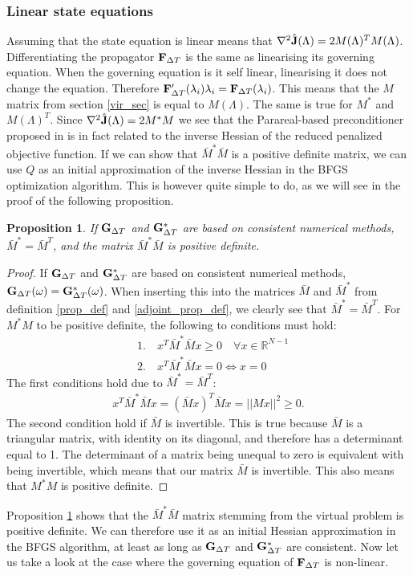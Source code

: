 \documentclass[11pt,a4paper]{article}
\newtheorem{proposition}{Proposition}
\begin{document}
\subsubsection{Linear state equations}
Assuming that the state equation is linear means that $\nabla^2 \hat{\bold J}(\Lambda)=2M(\Lambda)^TM(\Lambda)$. Differentiating the propagator $\bold F_{\Delta T}$ is the same as linearising its governing equation. When the governing equation is it self linear, linearising it does not change the equation. Therefore $\bold F_{\Delta T}'(\lambda_i)\lambda_i = \bold F_{\Delta T}(\lambda_i)$. This means that the $M$ matrix from section \ref{vir_sec} is equal to $M(\Lambda)$. The same is true for $M^*$ and $M(\Lambda)^T$. Since  $\nabla^2 \hat{\bold J}(\Lambda)=2M^*M$ we see that the Parareal-based preconditioner proposed in \cite{maday2002parareal} is in fact related to the inverse Hessian of the reduced penalized objective function. If we can show that $\bar M^*\bar M$ is a positive definite matrix, we can use $Q$ as an initial approximation of the inverse Hessian in the BFGS optimization algorithm. This is however quite simple to do, as we will see in the proof of the following proposition.
\begin{proposition} \label{pos_def_prop}
 If $\bold G_{\Delta T}$ and $\bold G_{\Delta T}^*$ are based on consistent numerical methods, $\bar M^*=\bar M^T$, and the matrix $\bar M^*\bar M$ is positive definite.
\end{proposition}
\begin{proof}
If $\bold G_{\Delta T}$ and $\bold G_{\Delta T}^*$ are based on consistent numerical methods, $\bold G_{\Delta T}(\omega)=\bold G_{\Delta T}^*(\omega)$. When inserting this into the matrices $\bar M$ and $\bar M^*$ from definition \ref{prop_def} and \ref{adjoint_prop_def}, we clearly see that $\bar M^*=\bar M^T$. For $M^*M$ to be positive definite, the following to conditions must hold:
\begin{align*}
&1.\quad x^T\bar M^*\bar Mx \geq 0 \quad \forall x\in\mathbb{R}^{N-1} \\
&2.\quad x^T\bar M^*\bar Mx =0 \iff x=0
\end{align*}
The first conditions hold due to $\bar M^*=\bar M^T$:
\begin{align*}
x^T\bar M^*\bar Mx = (\bar Mx)^T\bar Mx = ||Mx||^2 \geq 0.
\end{align*}
The second condition hold if $\bar M$ is invertible. This is true because $\bar M$ is a triangular matrix, with identity on its diagonal, and therefore has a determinant equal to 1. The determinant of a matrix being unequal to zero is equivalent with being invertible, which means that our matrix $\bar M$ is invertible. This also means that $M^*M$ is positive definite.
\end{proof}
Proposition \ref{pos_def_prop} shows that the $\bar M^*\bar M$ matrix stemming from the virtual problem is positive definite. We can therefore use it as an initial Hessian approximation in the BFGS algorithm, at least as long as $\bold G_ {\Delta T}$ and $\bold G_ {\Delta T}^*$ are consistent. Now let us take a look at the case where the governing equation of $\bold F_{\Delta T}$ is non-linear.
\end{document}
